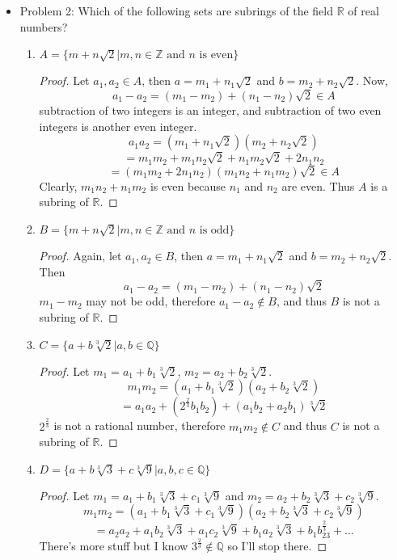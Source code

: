 \documentclass[hidelinks,12pt]{article}
\newcommand{\R}{\mathbb{R}}
\newcommand{\Z}{\mathbb{Z}}
\newcommand{\Q}{\mathbb{Q}}
\begin{document}
\begin{itemize}
\begin{enumerate}[label=(\alph*)]
\begin{proof}
\begin{enumerate}[label=\roman*]
            \item $a-b=\frac{m_1}{n_1}-\frac{m_2}{n_2}=\frac{m_1n_2-m_2n_1}{n_1n_2}\in H$, because as we showed above, $(n_1n_2,k)=1$.
            \item $a\cdot b=\frac{m_1m_2}{n_1n_2}\in H$, of course.
        \end{enumerate}
        Thus this subset forms a subring.
        \end{proof}
    \end{enumerate}
    \item Problem 2: Which of the following sets are subrings of the field $\R$ of real numbers?\begin{enumerate}[label=(\alph*)]
        \item $A=\{m+n\sqrt{2}|m,n\in\Z\text{ and $n$ is even}\}$\begin{proof}Let $a_1,a_2\in A$, then $a=m_1+n_1\sqrt{2}$ and $b=m_2+n_2\sqrt{2}$. Now, $$a_1-a_2=(m_1-m_2)+(n_1-n_2)\sqrt{2}\in A$$ subtraction of two integers is an integer, and subtraction of two even integers is another even integer.\newline $$a_1a_2=(m_1+n_1\sqrt{2})(m_2+n_2\sqrt{2})$$ $$=m_1m_2+m_1n_2\sqrt{2}+n_1m_2\sqrt2+2n_1n_2$$ $$=(m_1m_2+2n_1n_2)(m_1n_2+n_1m_2)\sqrt{2}\in A$$ Clearly, $m_1n_2+n_1m_2$ is even because $n_1$ and $n_2$ are even. Thus $A$ is a subring of $\R$.
        \end{proof}
        \item $B=\{m+n\sqrt{2}|m,n\in\Z\text{ and $n$ is odd}\}$\begin{proof} Again, let $a_1,a_2\in B$, then $a=m_1+n_1\sqrt{2}$ and $b=m_2+n_2\sqrt{2}$. Then $$a_1-a_2=(m_1-m_2)+(n_1-n_2)\sqrt{2}$$ $m_1-m_2$ may not be odd, therefore $a_1-a_2\notin B$, and thus $B$ is not a subring of $\R$.
        \end{proof}
        \item $C=\{a+b\sqrt[3]{2}|a,b\in\Q\}$\begin{proof}Let $m_1=a_1+b_1\sqrt[3]2$, $m_2=a_2+b_2\sqrt[3]2$. $$m_1m_2=(a_1+b_1\sqrt[3]2)(a_2+b_2\sqrt[3]2)$$ $$=a_1a_2+(2^{\frac{2}{3}}b_1b_2)+(a_1b_2+a_2b_1)\sqrt[3]2$$ $2^{\frac{2}{3}}$ is not a rational number, therefore $m_1m_2\notin C$ and thus $C$ is not a subring of $\R$.
        \end{proof} 
        \item $D=\{a+b\sqrt[3]{3}+c\sqrt[3]{9}|a,b,c\in\Q\}$\begin{proof}Let $m_1=a_1+b_1\sqrt[3]3+c_1\sqrt[3]9$ and $m_2=a_2+b_2\sqrt[3]3+c_2\sqrt[3]9$. $$m_1m_2=(a_1+b_1\sqrt[3]3+c_1\sqrt[3]9)(a_2+b_2\sqrt[3]3+c_2\sqrt[3]9)$$ $$=a_2a_2+a_1b_2\sqrt[3]{3}+a_1c_2\sqrt[3]{9}+b_1a_2\sqrt[3]{3}+b_1b_23^{\frac{2}{3}}+...$$ There's more stuff but I know $3^{\frac{2}{3}}\notin\Q$ so I'll stop there.

\end{proof}
\end{enumerate}
\end{itemize}
\end{document}

